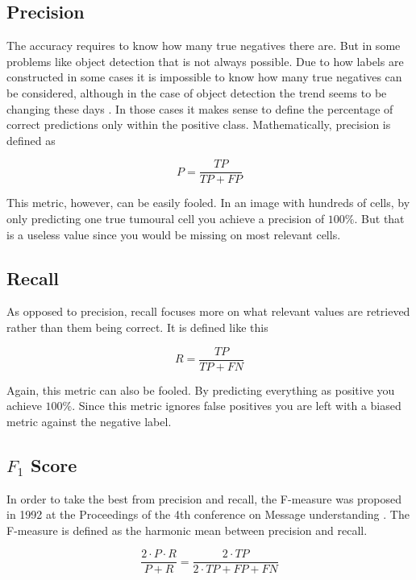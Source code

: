 \subsection{Precision}

The accuracy requires to know how many true negatives there are. But in some problems like object detection that is not always possible. Due to how labels are constructed in some cases it is impossible to know how many true negatives can be considered, although in the case of object detection the trend seems to be changing these days \cite{kirillov2023segment}. In those cases it makes sense to define the percentage of correct predictions only within the positive class. Mathematically, precision is defined as

\begin{equation}
    P = \frac{TP}{TP + FP}
\end{equation}

This metric, however, can be easily fooled. In an image with hundreds of cells, by only predicting one true tumoural cell you achieve a precision of $100\%$. But that is a useless value since you would be missing on most relevant cells.

\subsection{Recall}

As opposed to precision, recall focuses more on what relevant values are retrieved rather than them being correct. It is defined like this

\begin{equation}
    R = \frac{TP}{TP + FN}
\end{equation}

Again, this metric can also be fooled. By predicting everything as positive you achieve $100\%$. Since this metric ignores false positives you are left with a biased metric against the negative label.

\subsection{$F_1$ Score}\label{sec:f1}

In order to take the best from precision and recall, the F-measure was proposed in 1992 at the Proceedings of the 4th conference on Message understanding \cite{10.5555/1072064}. The F-measure is defined as the harmonic mean between precision and recall.

\begin{equation}
    \frac{2 \cdot P \cdot R}{P + R} = \frac{2 \cdot TP}{2 \cdot TP + FP + FN}
\end{equation}

